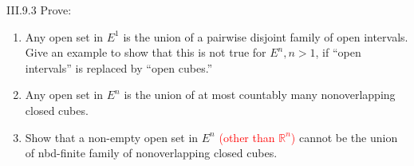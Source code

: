 \begin{problem}{III.9.3}
Prove:
\begin{enumerate}[label={(\alph*)}]
	\item Any open set in \(E^{1}\) is the union of a pairwise disjoint family of open intervals. Give an example to show that this is not true for \( E^{n}, n > 1 \), if ``open intervals'' is replaced by ``open cubes.\@''
	\item Any open set in \( E^{n} \) is the union of at most countably many nonoverlapping closed cubes.
	\item Show that a non-empty open set in \( E^{n} \) \textcolor{red}{(other than \( \mathbb{R}^{n} \))} cannot be the union of nbd-finite family of nonoverlapping closed cubes.
\end{enumerate}
\end{problem}


